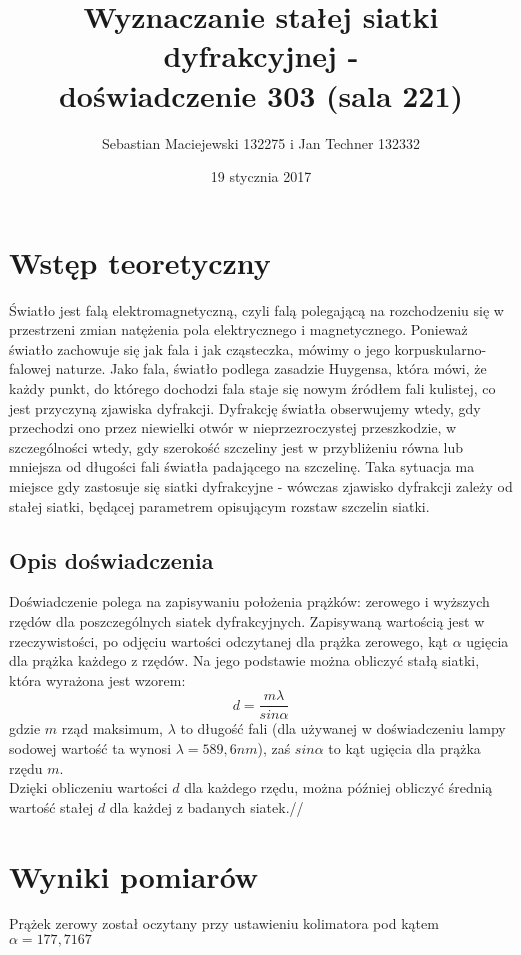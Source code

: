 \documentclass[10pt,a4paper]{article}
\author{Sebastian Maciejewski 132275 i Jan Techner 132332}
\title{Wyznaczanie stałej siatki dyfrakcyjnej - \\ doświadczenie 303 (sala 221)}
\date{19 stycznia 2017}
\newcommand{\forceindent}{\leavevmode{\parindent=3em\indent}}
\begin{document}
\maketitle
\section{Wstęp teoretyczny}
\forceindent Światło jest falą elektromagnetyczną, czyli falą polegającą na rozchodzeniu się w przestrzeni zmian natężenia pola elektrycznego i magnetycznego. Ponieważ światło 
zachowuje się jak fala i jak cząsteczka, mówimy o jego korpuskularno-falowej naturze. Jako fala, światło podlega zasadzie Huygensa, która mówi, że każdy punkt, do którego dochodzi fala
staje się nowym źródłem fali kulistej, co jest przyczyną zjawiska dyfrakcji. Dyfrakcję światła obserwujemy wtedy, gdy przechodzi ono przez niewielki otwór w nieprzezroczystej przeszkodzie, 
w szczególności wtedy, gdy szerokość szczeliny jest w przybliżeniu równa lub mniejsza od długości fali światła padającego na szczelinę.
Taka sytuacja ma miejsce gdy zastosuje się siatki dyfrakcyjne - wówczas zjawisko dyfrakcji zależy od stałej siatki, będącej parametrem opisującym rozstaw szczelin siatki.

\subsection*{Opis doświadczenia}
\forceindent Doświadczenie polega na zapisywaniu położenia prążków: zerowego i wyższych rzędów dla poszczególnych siatek dyfrakcyjnych. Zapisywaną wartością jest w rzeczywistości,
po odjęciu wartości odczytanej dla prążka zerowego, kąt $\alpha$ ugięcia dla prążka każdego z rzędów. Na jego podstawie można obliczyć stałą siatki, która wyrażona jest wzorem:
\begin{equation}
d=\frac{m\lambda}{sin\alpha}
\end{equation}
gdzie $m$ rząd maksimum, $\lambda$ to długość fali (dla używanej w doświadczeniu lampy sodowej wartość ta wynosi $\lambda = 589,6nm$), zaś $sin\alpha$ to kąt ugięcia dla prążka rzędu $m$.\\
Dzięki obliczeniu wartości $d$ dla każdego rzędu, można później obliczyć średnią wartość stałej $d$ dla każdej z badanych siatek.//

\newpage
\section{Wyniki pomiarów}

Prążek zerowy został oczytany przy ustawieniu kolimatora pod kątem $\alpha = 177,7167$\\
\end{document}
